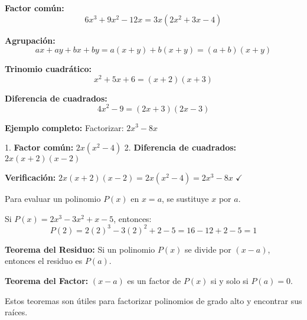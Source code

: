 \begin{example}
\textbf{Factor común:}
$$6x^3 + 9x^2 - 12x = 3x(2x^2 + 3x - 4)$$

\textbf{Agrupación:}
$$ax + ay + bx + by = a(x + y) + b(x + y) = (a + b)(x + y)$$

\textbf{Trinomio cuadrático:}
$$x^2 + 5x + 6 = (x + 2)(x + 3)$$

\textbf{Diferencia de cuadrados:}
$$4x^2 - 9 = (2x + 3)(2x - 3)$$

\textbf{Ejemplo completo:}
Factorizar: $2x^3 - 8x$

1. \textbf{Factor común:} $2x(x^2 - 4)$
2. \textbf{Diferencia de cuadrados:} $2x(x + 2)(x - 2)$

\textbf{Verificación:} $2x(x + 2)(x - 2) = 2x(x^2 - 4) = 2x^3 - 8x$ $\checkmark$
\end{example}


\begin{definition}
Para evaluar un polinomio $P(x)$ en $x = a$, se sustituye $x$ por $a$.
\end{definition}

\begin{example}
Si $P(x) = 2x^3 - 3x^2 + x - 5$, entonces:
$$P(2) = 2(2)^3 - 3(2)^2 + 2 - 5 = 16 - 12 + 2 - 5 = 1$$
\end{example}

\begin{theorem}
\textbf{Teorema del Residuo:} Si un polinomio $P(x)$ se divide por $(x - a)$, entonces el residuo es $P(a)$.

\noindent \textbf{Teorema del Factor:} $(x - a)$ es un factor de $P(x)$ si y solo si $P(a) = 0$.
\end{theorem}

Estos teoremas son útiles para factorizar polinomios de grado alto y encontrar sus raíces.